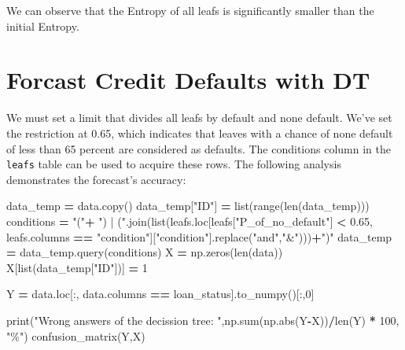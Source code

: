 \documentclass[
]{book}
\newenvironment{Shaded}{\begin{snugshade}}{\end{snugshade}}
\newcommand{\BuiltInTok}[1]{#1}
\newcommand{\DecValTok}[1]{\textcolor[rgb]{0.00,0.00,0.81}{#1}}
\newcommand{\FloatTok}[1]{\textcolor[rgb]{0.00,0.00,0.81}{#1}}
\newcommand{\NormalTok}[1]{#1}
\newcommand{\OperatorTok}[1]{\textcolor[rgb]{0.81,0.36,0.00}{\textbf{#1}}}
\newcommand{\StringTok}[1]{\textcolor[rgb]{0.31,0.60,0.02}{#1}}
\begin{document}
We can observe that the Entropy of all leafs is significantly smaller than the initial Entropy.

\hypertarget{forcast-credit-defaults-with-dt}{%
\section{Forcast Credit Defaults with DT}\label{forcast-credit-defaults-with-dt}}

We must set a limit that divides all leafs by default and none default. We've set the restriction at 0.65, which indicates that leaves with a chance of none default of less than 65 percent are considered as defaults. The conditions column in the \texttt{leafs} table can be used to acquire these rows. The following analysis demonstrates the forecast's accuracy:

\begin{Shaded}
\begin{Highlighting}[]
\NormalTok{data\_temp }\OperatorTok{=}\NormalTok{ data.copy()}
\NormalTok{data\_temp[}\StringTok{"ID"}\NormalTok{] }\OperatorTok{=} \BuiltInTok{list}\NormalTok{(}\BuiltInTok{range}\NormalTok{(}\BuiltInTok{len}\NormalTok{(data\_temp)))}
\NormalTok{conditions }\OperatorTok{=} \StringTok{"("}\OperatorTok{+} \StringTok{") | ("}\NormalTok{.join(}\BuiltInTok{list}\NormalTok{(leafs.loc[leafs[}\StringTok{"P\_of\_no\_default"}\NormalTok{] }\OperatorTok{\textless{}} \FloatTok{0.65}\NormalTok{, leafs.columns }\OperatorTok{==} \StringTok{"condition"}\NormalTok{][}\StringTok{"condition"}\NormalTok{].replace(}\StringTok{"and"}\NormalTok{,}\StringTok{"\&"}\NormalTok{)))}\OperatorTok{+}\StringTok{")"}
\NormalTok{data\_temp }\OperatorTok{=}\NormalTok{ data\_temp.query(conditions)}
\NormalTok{X }\OperatorTok{=}\NormalTok{ np.zeros(}\BuiltInTok{len}\NormalTok{(data))}
\NormalTok{X[}\BuiltInTok{list}\NormalTok{(data\_temp[}\StringTok{"ID"}\NormalTok{])] }\OperatorTok{=} \DecValTok{1}

\NormalTok{Y }\OperatorTok{=}\NormalTok{ data.loc[:, data.columns }\OperatorTok{==} \StringTok{\textquotesingle{}loan\_status\textquotesingle{}}\NormalTok{].to\_numpy()[:,}\DecValTok{0}\NormalTok{]}

\BuiltInTok{print}\NormalTok{(}\StringTok{"Wrong answers of the decission tree: "}\NormalTok{,np.}\BuiltInTok{sum}\NormalTok{(np.}\BuiltInTok{abs}\NormalTok{(Y}\OperatorTok{{-}}\NormalTok{X))}\OperatorTok{/}\BuiltInTok{len}\NormalTok{(Y) }\OperatorTok{*} \DecValTok{100}\NormalTok{, }\StringTok{"\%"}\NormalTok{)}
\NormalTok{confusion\_matrix(Y,X)}
\end{Highlighting}
\end{Shaded}
\end{document}
